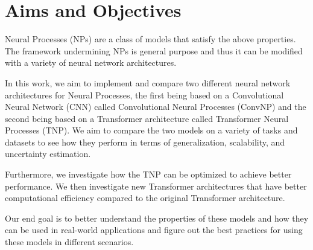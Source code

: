 \documentclass[../../main.tex]{subfiles}
\begin{document}

\section{Aims and Objectives}

Neural Processes (NPs) \cite{garnelo2018neural} are a class of models that satisfy the above properties. The framework undermining NPs is general purpose and thus it can be modified with a variety of neural network architectures. 

In this work, we aim to implement and compare two different neural network architectures for Neural Processes, the first being based on a Convolutional Neural Network (CNN) called Convolutional Neural Processes (ConvNP) and the second being based on a Transformer architecture called Transformer Neural Processes (TNP). We aim to compare the two models on a variety of tasks and datasets to see how they perform in terms of generalization, scalability, and uncertainty estimation. 

Furthermore, we investigate how the TNP can be optimized to achieve better performance. We then investigate new Transformer architectures that have better computational efficiency compared to the original Transformer architecture. 

Our end goal is to better understand the properties of these models and how they can be used in real-world applications and figure out the best practices for using these models in different scenarios. 





\ifSubfilesClassLoaded{%
    \printbibliography{}
}{} 
\end{document}
